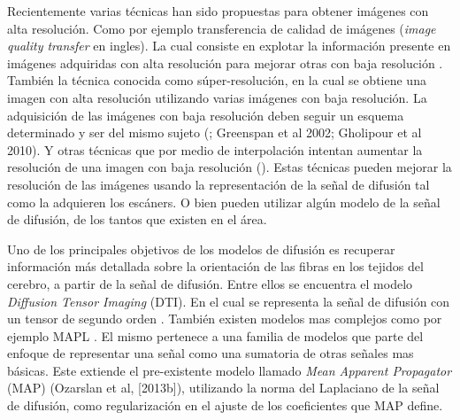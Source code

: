 \documentclass[a4paper,10pt]{article}
\begin{document}
Recientemente varias técnicas han sido propuestas para obtener imágenes con alta resolución. Como 
por ejemplo 
transferencia de calidad de imágenes (\textit{image quality transfer} en ingles). La cual 
consiste en explotar la 
información presente en imágenes adquiridas con alta resolución para mejorar otras con baja resolución 
\citep{Alexander2014}. También la técnica conocida como súper-resolución, en 
la cual se obtiene una imagen con alta resolución utilizando varias imágenes con baja resolución. 
La adquisición de las imágenes con baja 
resolución deben seguir un esquema determinado y ser del mismo sujeto (\cite{Irani1993,Robinson2010}; Greenspan et al 
2002; Gholipour et al 2010). Y otras técnicas que por medio de interpolación 
intentan aumentar la resolución de una imagen con baja resolución (\cite{Manjon2010}). Estas técnicas pueden mejorar la 
resolución de las imágenes usando la representación de la señal de difusión tal como la adquieren los escáners. O bien 
pueden utilizar algún modelo de la señal de difusión, de los tantos que existen en el área.


Uno de los principales objetivos de los modelos de difusión es recuperar información más detallada 
sobre la orientación de las fibras en los tejidos del cerebro, a partir de la señal de difusión. Entre ellos se 
encuentra el modelo \textit{Diffusion Tensor Imaging} (DTI). En el cual se representa la 
se\~nal de difusión con un tensor de segundo orden \citep{Basser1994}. También existen modelos mas 
complejos como por ejemplo MAPL \citep{Fick2016365}. El 
mismo pertenece a una familia de modelos que parte del enfoque de representar una señal como una sumatoria de otras 
señales mas básicas. 
Este extiende el pre-existente modelo llamado \textit{Mean Apparent Propagator} (MAP) (Ozarslan et al, [2013b]), 
utilizando la norma del Laplaciano de la se\~nal de difusión, como regularizaci\'on en el ajuste de los coeficientes que 
MAP define. 
\end{document}
